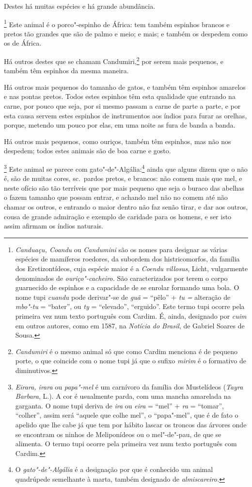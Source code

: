  Destes há muitas espécies e há grande abundância.

\footnote{ \textit{Canduaçu, Coandu} ou
\textit{Candumini} são os nomes para designar as várias espécies de
mamíferos roedores, da subordem dos histricomorfos, da família dos
Eretizontídeos, cuja espécie maior é a \textit{Coendu villosus}, 
Licht, vulgarmente denominados de \textit{ouriço"-cacheiro.} São
caracterizados por terem o corpo guarnecido de espinhos e a capacidade
de se enrolar formando uma bola. O nome tupi \textit{cuandu} pode
derivar"-se de \textit{guã} = ``pêlo'' + \textit{tu =} alteração de
\textit{mbo"-tu} = ``bater'', ou \textit{ty} = ``elevado'', ``erguido''. Este
termo tupi ocorre pela primeira vez num texto português com Cardim. É,
ainda, designado por \textit{cuim} em outros autores, como em 1587, na
\textit{Notícia do Brasil}, de Gabriel Soares de Sousa.} Este
animal é o porco"-espinho de África: tem também espinhos brancos e
pretos tão grandes que são de palmo e meio; e mais; e também os
despedem como os de África.

 Há outros destes que se chamam Candumiri,\footnote{ \textit{Candumiri} 
é o mesmo animal só que como Cardim menciona é de pequeno porte, o
que coincide com o nome tupi já que o sufixo \textit{mirim} é o
formativo de diminutivos.} por serem mais pequenos, e também
têm espinhos da mesma maneira.

 Há outros mais pequenos do tamanho de gatos, e também têm espinhos
amarelos e nas pontas pretos. Todos estes espinhos têm esta qualidade
que entrando na carne, por pouco que seja, por si mesmo passam a carne
de parte a parte, e por esta causa servem estes espinhos de
instrumentos aos índios para furar as orelhas, porque, metendo um pouco
por elas, em uma noite as fura de banda a banda.

 Há outros mais pequenos, como ouriços, também têm espinhos, mas não nos
despedem; todos estes animais são de boa carne e gosto. 

\footnote{ \textit{Eirara, irara} ou
\textit{papa"-mel} é um carnívoro da família dos Mustelídeos
(\textit{Tayra Barbara}, L.). A cor é usualmente parda, com uma mancha
amarelada na garganta. O nome tupi deriva de \textit{ira} ou
\textit{eira} = ``mel'' + \textit{ra} = ``tomar'', ``colher'', assim será ``aquele 
que colhe mel'', o ``papa"-mel'', que é de fato o apelido que 
lhe cabe já que tem por hábito lascar os troncos das árvores onde se
encontram os ninhos de Meliponídeos ou o mel"-de"-pau, de que se
alimenta. O termo tupi ocorre pela primeira vez num texto português com
Cardim.} Este animal se parece com gato"-de"-Algália:\footnote{ O 
\textit{gato"-de"-Algália} é a designação por que é conhecido um animal
quadrúpede semelhante à marta, também designado de
\textit{almiscareiro.}} ainda que alguns dizem que o não é, são de
muitas cores, sc.~pardos pretos, e brancos: não comem mais que mel, e
neste ofício são tão terríveis que por mais pequeno que seja o buraco
das abelhas o fazem tamanho que possam entrar, e achando mel não no
comem até não chamar os outros, e entrando o maior dentro não faz senão
tirar, e dar aos outros, cousa de grande admiração e exemplo de
caridade para os homens, e ser isto assim afirmam os índios naturais.

